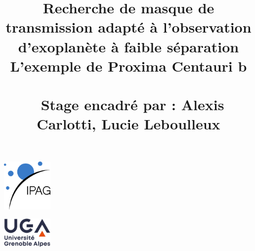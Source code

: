 \documentclass{article}
\date{}
\title{\vspace{10em}\textbf{Recherche de masque de transmission adapté à l'observation d'exoplanète à faible séparation} \\ \vspace{3em} L'exemple de Proxima Centauri b \vspace{4em} \\ \large{Stage encadré par : Alexis Carlotti, Lucie Leboulleux}}
\begin{document}
\maketitle
\vspace{5em}
\begin{center}
    \begin{minipage}{0.4\textwidth}
        \centering
        \includegraphics[width = 25mm]{figures/logo_ipag.jpg}
    \end{minipage}
    \begin{minipage}{0.4\textwidth}
        \centering    
        \includegraphics[width = 25mm]{figures/logo_uga.jpg}
    \end{minipage}
\end{center}
\thispagestyle{fancy}
\clearpage


%

%






\end{document}
